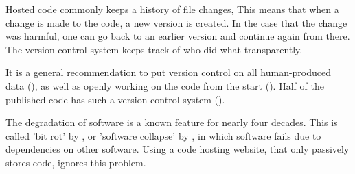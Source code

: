 
Hosted code commonly keeps a history of file changes,
This means that when a change is made to the code,
a new version is created. In the case that the change was harmful,
one can go back to an earlier version and continue again from there.
The version control system keeps track of who-did-what transparently.

It is a general recommendation to put version control
on all human-produced data (\cite{wilson2014best}),
as well as openly working on the code from the start (\cite{jimenez2017four}).
Half of the published code has such a version control 
system (\cite{stodden2018empirical}).

The degradation of software is a known feature for nearly 
four decades.
This is called 'bit rot' by \cite{steele1983hacker},
or 'software collapse' by \cite{hinsen2019dealing},
in which software fails due to dependencies on other 
software.
Using a code hosting website, 
that only passively stores code,
ignores this problem.

